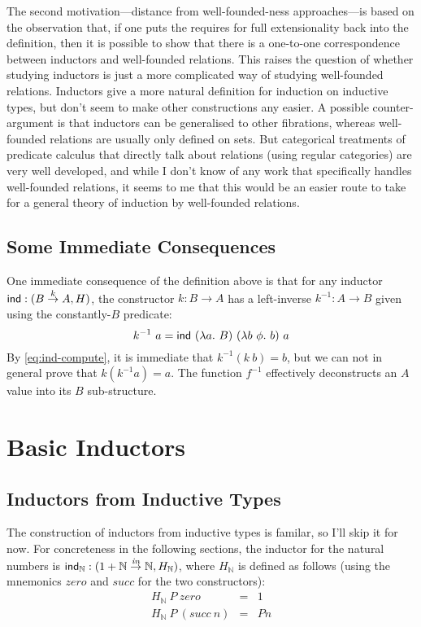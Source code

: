 \documentclass{amsart}
\newcommand{\inn}{\mathit{in}}
\newcommand{\cons}[1]{\mathit{#1}}
\begin{document}
The second motivation---distance from well-founded-ness
approaches---is based on the observation that, if one puts the
requires for full extensionality back into the definition, then it is
possible to show that there is a one-to-one correspondence between
inductors and well-founded relations. This raises the question of
whether studying inductors is just a more complicated way of studying
well-founded relations. Inductors give a more natural definition for
induction on inductive types, but don't seem to make other
constructions any easier. A possible counter-argument is that
inductors can be generalised to other fibrations, whereas well-founded
relations are usually only defined on sets. But categorical treatments
of predicate calculus that directly talk about relations (using
regular categories) are very well developed, and while I don't know of
any work that specifically handles well-founded relations, it seems to
me that this would be an easier route to take for a general theory of
induction by well-founded relations.

\subsection{Some Immediate Consequences}

One immediate consequence of the definition above is that for any
inductor $\mathsf{ind} : (B \stackrel{k}\to A, H)$, the constructor $k : B \to
A$ has a left-inverse $k^{-1} : A \to B$ given using the
constantly-$B$ predicate:
\begin{displaymath}
  k^{-1}\ a = \ind\ (\lambda a.\ B)\ (\lambda b\ \phi.\ b)\ a
\end{displaymath}
By \autoref{eq:ind-compute}, it is immediate that $k^{-1} (k\ b) = b$,
but we can not in general prove that $k (k^{-1} a) = a$. The function
$f^{-1}$ effectively deconstructs an $A$ value into its $B$
sub-structure.

\section{Basic Inductors}

\subsection{Inductors from Inductive Types}

The construction of inductors from inductive types is familar, so I'll
skip it for now. For concreteness in the following sections, the
inductor for the natural numbers is $\ind_{\mathbb{N}} : (1 +
\mathbb{N} \stackrel{\inn}\to \mathbb{N}, H_{\mathbb{N}})$, where
$H_{\mathbb{N}}$ is defined as follows (using the mnemonics
$\cons{zero}$ and $\cons{succ}$ for the two constructors):
\begin{eqnarray*}
  H_{\mathbb{N}}\ P\ \mathit{zero} & = & 1 \\
  H_{\mathbb{N}}\ P\ (\mathit{succ}\ n) & = & P n
\end{eqnarray*}
\end{document}
